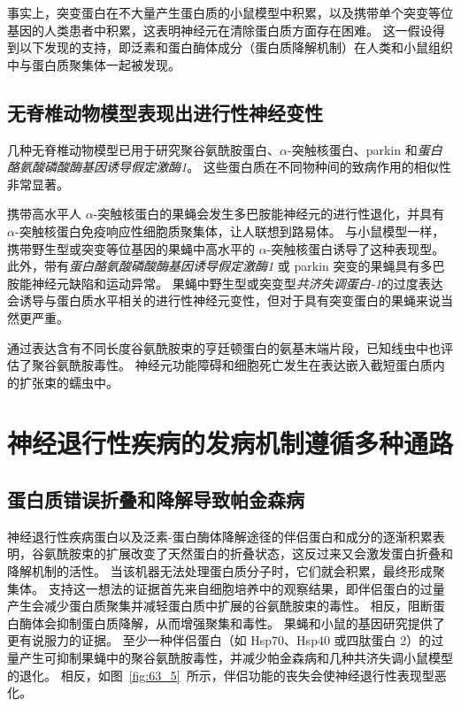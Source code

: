 事实上，突变蛋白在不大量产生蛋白质的小鼠模型中积累，以及携带单个突变等位基因的人类患者中积累，这表明神经元在清除蛋白质方面存在困难。
这一假设得到以下发现的支持，即泛素和蛋白酶体成分（蛋白质降解机制）在人类和小鼠组织中与蛋白质聚集体一起被发现。



\subsection{无脊椎动物模型表现出进行性神经变性}

几种无脊椎动物模型已用于研究聚谷氨酰胺蛋白、$\alpha$-突触核蛋白、parkin 和\textit{蛋白酪氨酸磷酸酶基因诱导假定激酶1}。
这些蛋白质在不同物种间的致病作用的相似性非常显著。


携带高水平人 $\alpha$-突触核蛋白的果蝇会发生多巴胺能神经元的进行性退化，并具有 $\alpha$-突触核蛋白免疫响应性细胞质聚集体，让人联想到路易体。
与小鼠模型一样，携带野生型或突变等位基因的果蝇中高水平的 $\alpha$-突触核蛋白诱导了这种表现型。
此外，带有\textit{蛋白酪氨酸磷酸酶基因诱导假定激酶1} 或 parkin 突变的果蝇具有多巴胺能神经元缺陷和运动异常。
果蝇中野生型或突变型\textit{共济失调蛋白-1}的过度表达会诱导与蛋白质水平相关的进行性神经元变性，但对于具有突变蛋白的果蝇来说当然更严重。


通过表达含有不同长度谷氨酰胺束的亨廷顿蛋白的氨基末端片段，已知线虫中也评估了聚谷氨酰胺毒性。
神经元功能障碍和细胞死亡发生在表达嵌入截短蛋白质内的扩张束的蠕虫中。



\section{神经退行性疾病的发病机制遵循多种通路}

\subsection{蛋白质错误折叠和降解导致帕金森病}

神经退行性疾病蛋白以及泛素-蛋白酶体降解途径的伴侣蛋白和成分的逐渐积累表明，谷氨酰胺束的扩展改变了天然蛋白的折叠状态，这反过来又会激发蛋白折叠和降解机制的活性。
当该机器无法处理蛋白质分子时，它们就会积累，最终形成聚集体。
支持这一想法的证据首先来自细胞培养中的观察结果，即伴侣蛋白的过量产生会减少蛋白质聚集并减轻蛋白质中扩展的谷氨酰胺束的毒性。
相反，阻断蛋白酶体会抑制蛋白质降解，从而增强聚集和毒性。
果蝇和小鼠的基因研究提供了更有说服力的证据。
至少一种伴侣蛋白（如 Hsp70、Hsp40 或四肽蛋白 2）的过量产生可抑制果蝇中的聚谷氨酰胺毒性，并减少帕金森病和几种共济失调小鼠模型的退化。
相反，如图~\ref{fig:63_5}~所示，伴侣功能的丧失会使神经退行性表现型恶化。


